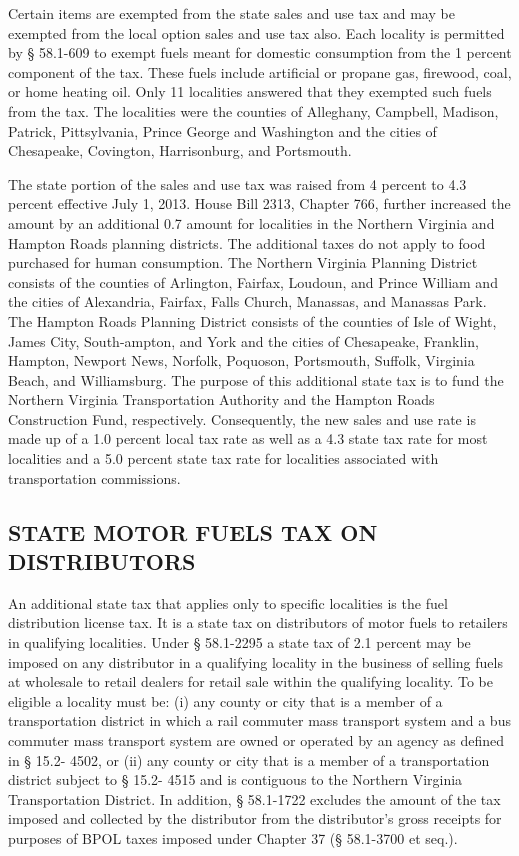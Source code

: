 \documentclass[
]{book}
\begin{document}
Certain items are exempted from the state sales and use tax and may be exempted from the local option sales and use tax also. Each locality is permitted by § 58.1-609 to exempt fuels meant for domestic consumption from the 1 percent component of the tax. These fuels include artificial or propane gas, firewood, coal, or home heating oil. Only 11 localities answered that they exempted such fuels from the tax. The localities were the counties of Alleghany, Campbell, Madison, Patrick, Pittsylvania, Prince George and Washington and the cities of Chesapeake, Covington, Harrisonburg, and Portsmouth.

The state portion of the sales and use tax was raised from 4 percent to 4.3 percent effective July 1, 2013. House Bill 2313, Chapter 766, further increased the amount by an additional 0.7 amount for localities in the Northern Virginia and Hampton Roads planning districts. The additional taxes do not apply to food purchased for human consumption. The Northern Virginia Planning District consists of the counties of Arlington, Fairfax, Loudoun, and Prince William and the cities of Alexandria, Fairfax, Falls Church, Manassas, and Manassas Park. The Hampton Roads Planning District consists of the counties of Isle of Wight, James City, South-ampton, and York and the cities of Chesapeake, Franklin, Hampton, Newport News, Norfolk, Poquoson, Portsmouth, Suffolk, Virginia Beach, and Williamsburg. The purpose of this additional state tax is to fund the Northern Virginia Transportation Authority and the Hampton Roads Construction Fund, respectively. Consequently, the new sales and use rate is made up of a 1.0 percent local tax rate as well as a 4.3 state tax rate for most localities and a 5.0 percent state tax rate for localities associated with transportation commissions.

\hypertarget{state-motor-fuels-tax-on-distributors}{%
\subsection{STATE MOTOR FUELS TAX ON DISTRIBUTORS}\label{state-motor-fuels-tax-on-distributors}}

An additional state tax that applies only to specific localities is the fuel distribution license tax. It is a state tax on distributors of motor fuels to retailers in qualifying localities. Under § 58.1-2295 a state tax of 2.1 percent may be imposed on any distributor in a qualifying locality in the business of selling fuels at wholesale to retail dealers for retail sale within the qualifying locality. To be eligible a locality must be: (i) any county or city that is a member of a transportation district in which a rail commuter mass transport system and a bus commuter mass transport system are owned or operated by an agency as defined in § 15.2- 4502, or (ii) any county or city that is a member of a transportation district subject to § 15.2- 4515 and is contiguous to the Northern Virginia Transportation District. In addition, § 58.1-1722 excludes the amount of the tax imposed and collected by the distributor from the distributor's gross receipts for purposes of BPOL taxes imposed under Chapter 37 (§ 58.1-3700 et seq.).
\end{document}
